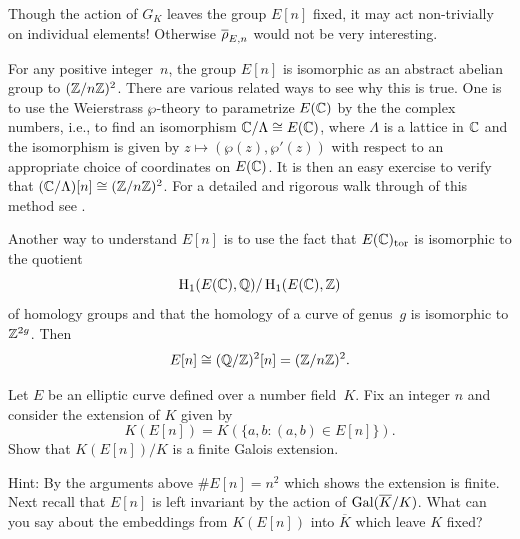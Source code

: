 \begin{warning}
Though the action of $G_K$ leaves the group $E[n]$ fixed,
it may act non-trivially on individual elements! Otherwise
$\overline{\rho}_{E,n}$ would not be very interesting.
\end{warning}

For any positive integer~$n$, the group $E[n]$ is isomorphic as an
abstract abelian group to $(\mathbb{Z}/n\mathbb{Z})^2$.  There are various
related ways to see why this is true. One is to use the Weierstrass
$\wp$-theory to parametrize $E(\mathbb{C})$ by the the complex numbers, i.e.,
to find an isomorphism $\mathbb{C}/\Lambda \cong E(\mathbb{C})$, where $\Lambda$ is a
lattice in $\mathbb{C}$ and the isomorphism is given by $z\mapsto
(\wp(z),\wp'(z))$ with respect to an appropriate choice of coordinates
on $E(\mathbb{C})$.  It is then an easy exercise to verify that
$(\mathbb{C}/\Lambda)[n]\cong (\mathbb{Z}/n\mathbb{Z})^2$.
For a detailed and rigorous walk through of this method see
\cite[Ch.~1.4]{diamond-shurman}.

Another way to understand $E[n]$ is to use the fact
that $E(\mathbb{C})_{\operatorname{tor}}$ is isomorphic
to the quotient
$$\operatorname{H}_1(E(\mathbb{C}),\mathbb{Q})/\operatorname{H}_1(E(\mathbb{C}),\mathbb{Z})$$
of homology groups and that the homology of a curve
of genus~$g$ is isomorphic to $\mathbb{Z}^{2g}$.  Then
$$
 E[n]\cong (\mathbb{Q}/\mathbb{Z})^2[n] = (\mathbb{Z}/n\mathbb{Z})^2.
$$

\begin{exercise}\label{QE[p]finitegaloisext}
	Let $E$ be an elliptic curve defined over a number
	field~$K$. Fix an integer $n$ and consider the
	extension of $K$ given by
	$$
	K(E[n]) = K(\{a,b : (a,b) \in E[n]\}).
	$$
	Show that $K(E[n])/K$ is a finite Galois extension.
	
	Hint: By the arguments above $\#E[n] = n^2$ which shows
	the extension is finite. Next recall that $E[n]$ is left
	invariant by the action of $\operatorname{Gal}(\overline{K}/K)$. What
	can you say about the embeddings from $K(E[n])$ into
	$\overline{K}$ which leave $K$ fixed?
\end{exercise}

